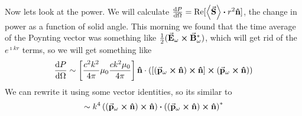 \documentclass[a4paper,twoside,master.tex]{subfiles}
\begin{document}
Now lets look at the power. We will calculate $ \dv{P}{\Omega} = \Re[\ev{ \va{S}} \vdot r^2 \vu{n}] $, the change in power as a function of solid angle. This morning we found that the time average of the Poynting vector was something like $ \frac{1}{2} ( \va{E}_{\omega} \cross \va{B}_{\omega}^*) $, which will get rid of the $ e^{\imath kr} $ terms, so we will get something like
\begin{equation}
    \dv{P}{\Omega} \sim \left[ \frac{c^2 k^2}{4 \pi} \mu_0 \frac{c k^2 \mu_0}{4 \pi} \right] \vu{n} \cdot \left( \left[ ( \va{p}_{\omega} \cross \vu{n}) \cross \vu{n} \right] \cross ( \va{p}_{\omega} \cross \vu{n}) \right)
\end{equation}
We can rewrite it using some vector identities, so its similar to
\begin{equation}
    \sim k^4 \left( ( \va{p}_{\omega} \cross \vu{n}) \cross \vu{n} \right) \vdot \left( ( \va{p}_{\omega} \cross \vu{n}) \cross \vu{n} \right)^*
\end{equation}
\end{document}
